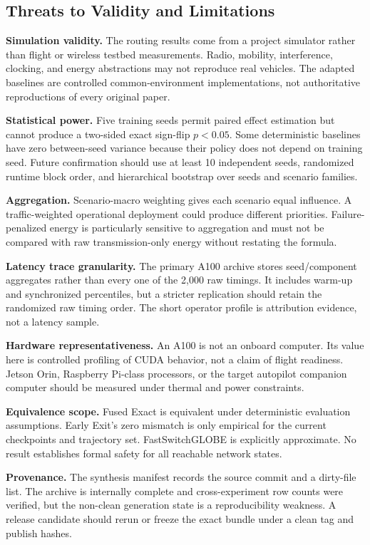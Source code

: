 \documentclass[drones,article,submit,moreauthors]{Definitions/mdpi}
\newcommand{\FastSG}{FastSwitchGLOBE}
\begin{document}
\subsection{Threats to Validity and Limitations}

\textbf{Simulation validity.} The routing results come from a project simulator rather than flight or wireless testbed measurements. Radio, mobility, interference, clocking, and energy abstractions may not reproduce real vehicles. The adapted baselines are controlled common-environment implementations, not authoritative reproductions of every original paper.

\textbf{Statistical power.} Five training seeds permit paired effect estimation but cannot produce a two-sided exact sign-flip $p<0.05$. Some deterministic baselines have zero between-seed variance because their policy does not depend on training seed. Future confirmation should use at least 10 independent seeds, randomized runtime block order, and hierarchical bootstrap over seeds and scenario families.

\textbf{Aggregation.} Scenario-macro weighting gives each scenario equal influence. A traffic-weighted operational deployment could produce different priorities. Failure-penalized energy is particularly sensitive to aggregation and must not be compared with raw transmission-only energy without restating the formula.

\textbf{Latency trace granularity.} The primary A100 archive stores seed/component aggregates rather than every one of the 2,000 raw timings. It includes warm-up and synchronized percentiles, but a stricter replication should retain the randomized raw timing order. The short operator profile is attribution evidence, not a latency sample.

\textbf{Hardware representativeness.} An A100 is not an onboard computer. Its value here is controlled profiling of CUDA behavior, not a claim of flight readiness. Jetson Orin, Raspberry Pi-class processors, or the target autopilot companion computer should be measured under thermal and power constraints.

\textbf{Equivalence scope.} Fused Exact is equivalent under deterministic evaluation assumptions. Early Exit's zero mismatch is only empirical for the current checkpoints and trajectory set. \FastSG{} is explicitly approximate. No result establishes formal safety for all reachable network states.

\textbf{Provenance.} The synthesis manifest records the source commit and a dirty-file list. The archive is internally complete and cross-experiment row counts were verified, but the non-clean generation state is a reproducibility weakness. A release candidate should rerun or freeze the exact bundle under a clean tag and publish hashes.
\end{document}
